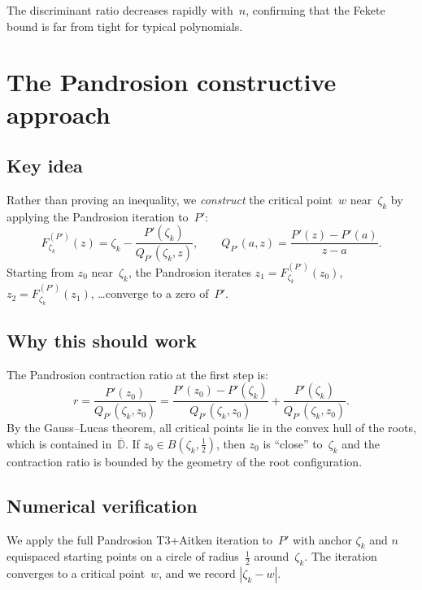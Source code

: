 \documentclass[11pt,a4paper]{article}
\theoremstyle{definition}
\theoremstyle{remark}
\begin{document}
The discriminant ratio decreases rapidly with~$n$, confirming that the Fekete bound is far from tight for typical polynomials.

\section{The Pandrosion constructive approach}
\label{sec:pandrosion}

\subsection{Key idea}

Rather than proving an inequality, we \emph{construct} the critical point~$w$ near~$\zeta_k$ by applying the Pandrosion iteration to~$P'$:
\[
F_{\zeta_k}^{(P')}(z) = \zeta_k - \frac{P'(\zeta_k)}{Q_{P'}(\zeta_k, z)}, \qquad Q_{P'}(a, z) = \frac{P'(z) - P'(a)}{z - a}.
\]
Starting from $z_0$ near~$\zeta_k$, the Pandrosion iterates $z_1 = F_{\zeta_k}^{(P')}(z_0)$, $z_2 = F_{\zeta_k}^{(P')}(z_1)$, \ldots converge to a zero of~$P'$.

\subsection{Why this should work}

The Pandrosion contraction ratio at the first step is:
\begin{equation}
\label{eq:ratio}
r = \frac{P'(z_0)}{Q_{P'}(\zeta_k, z_0)} = \frac{P'(z_0) - P'(\zeta_k)}{Q_{P'}(\zeta_k, z_0)} + \frac{P'(\zeta_k)}{Q_{P'}(\zeta_k, z_0)}.
\end{equation}
By the Gauss--Lucas theorem, all critical points lie in the convex hull of the roots, which is contained in~$\overline{\mathbb{D}}$.  If $z_0 \in B(\zeta_k, \tfrac{1}{2})$, then $z_0$ is ``close'' to~$\zeta_k$ and the contraction ratio is bounded by the geometry of the root configuration.

\subsection{Numerical verification}

We apply the full Pandrosion T3+Aitken iteration to~$P'$ with anchor $\zeta_k$ and $n$ equispaced starting points on a circle of radius~$\frac{1}{2}$ around~$\zeta_k$.  The iteration converges to a critical point~$w$, and we record $|\zeta_k - w|$.
\end{document}
